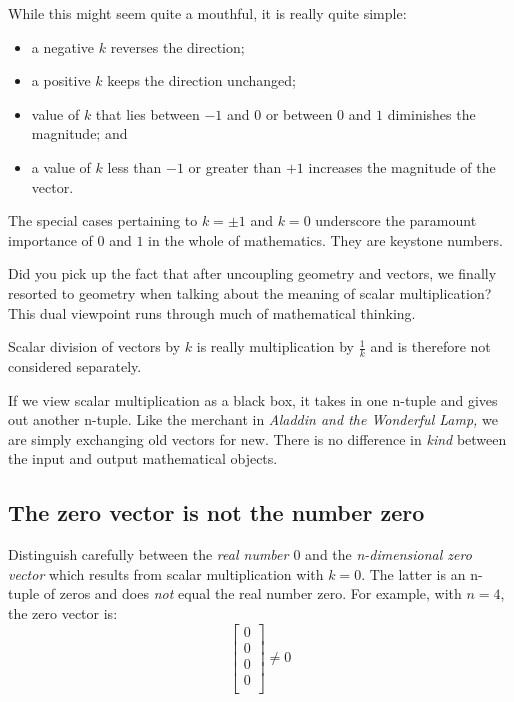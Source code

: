 \documentclass[
  a4paper,
]{article}
\providecommand{\tightlist}{%
  \setlength{\itemsep}{0pt}\setlength{\parskip}{0pt}}
\begin{document}
While this might seem quite a mouthful, it is really quite simple:

\begin{itemize}
\tightlist
\item
  a negative \(k\) reverses the direction;
\item
  a positive \(k\) keeps the direction unchanged;
\item
  value of \(k\) that lies between \(-1\) and \(0\) or between \(0\) and
  \(1\) diminishes the magnitude; and
\item
  a value of \(k\) less than \(-1\) or greater than \(+1\) increases the
  magnitude of the vector.
\end{itemize}

The special cases pertaining to \(k = \pm 1\) and \(k = 0\) underscore
the paramount importance of \(0\) and \(1\) in the whole of mathematics.
They are keystone numbers.

Did you pick up the fact that after uncoupling geometry and vectors, we
finally resorted to geometry when talking about the meaning of scalar
multiplication? This dual viewpoint runs through much of mathematical
thinking.

Scalar division of vectors by \(k\) is really multiplication by
\(\frac{1}{k}\) and is therefore not considered separately.

If we view scalar multiplication as a black box, it takes in one n-tuple
and gives out another n-tuple. Like the merchant in \emph{Aladdin and
the Wonderful Lamp,} we are simply exchanging old vectors for new. There
is no difference in \emph{kind} between the input and output
mathematical objects.

\hypertarget{the-zero-vector-is-not-the-number-zero}{%
\subsection{The zero vector is not the number
zero}\label{the-zero-vector-is-not-the-number-zero}}

Distinguish carefully between the \emph{real number \(0\)} and the
\emph{n-dimensional zero vector} which results from scalar
multiplication with \(k = 0\). The latter is an n-tuple of zeros and
does \emph{not} equal the real number zero. For example, with \(n = 4\),
the zero vector is: \[
\begin{bmatrix}0\\0\\0\\0\\\end{bmatrix} \neq 0
\]
\end{document}

